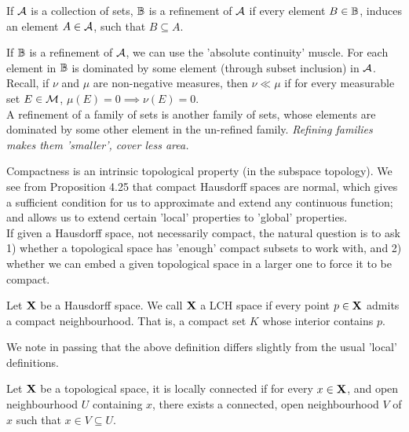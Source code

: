 \documentclass[../../main.tex]{subfiles}
\begin{document}
\begin{definition}[Refinement]\label{chp4:refinement-definition}
    If $\mathcal{A}$ is a collection of sets, ${\mathbb{B}}$ is a refinement of $\mathcal{A}$ if every element $B\in{\mathbb{B}}$, induces an element $A\in\mathcal{A}$, such that $B\subseteq A$.
\end{definition}
\begin{remark}
    If ${\mathbb{B}}$ is a refinement of $\mathcal{A}$, we can use the 'absolute continuity' muscle. For each element in ${\mathbb{B}}$ is dominated by some element (through subset inclusion) in $\mathcal{A}$. Recall, if $\nu$ and $\mu$ are non-negative measures, then $\nu\ll\mu$ if for every measurable set $E\in\mathcal{M}$, $\mu(E)=0\implies \nu(E)=0$.\\
    
    A refinement of a family of sets is another family of sets, whose elements are dominated by some other element in the un-refined family. \emph{Refining families makes them 'smaller', cover less area.}
\end{remark}


\newpage

Compactness is an intrinsic topological property (in the subspace topology). We see from Proposition 4.25 that compact Hausdorff spaces are normal, which gives a sufficient condition for us to approximate and extend any continuous function; and allows us to extend certain 'local' properties to 'global' properties. \\

If given a Hausdorff space, not necessarily compact, the natural question is to ask 1) whether a topological space has 'enough' compact subsets to work with, and 2) whether we can embed a given topological space in a larger one to force it to be compact.

\begin{definition}\label{chp4:LCH-definition}
    Let ${\mathbf{X}}$ be a Hausdorff space. We call ${\mathbf{X}}$ a LCH space if every point $p\in{\mathbf{X}}$ admits a compact neighbourhood. That is, a compact set $K$ whose interior contains $p$.
\end{definition} 

We note in passing that the above definition differs slightly from the usual 'local' definitions.

\begin{definition}\label{chp4:locally-connected-definition}
    Let ${\mathbf{X}}$ be a topological space, it is locally connected if for every $x\in{\mathbf{X}}$, and open neighbourhood $U$ containing $x$, there exists a connected, open neighbourhood $V$ of $x$ such that $x\in V\subseteq U$.
\end{definition}
\end{document}
